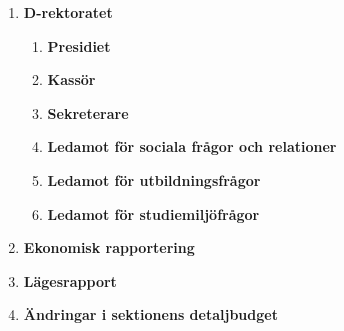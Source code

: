 \documentclass{protokoll}
\begin{document}
  \begin{enumerate}
    \item \textbf{D-rektoratet}
      \begin{enumerate}
        \item \textbf{Presidiet}
        \item \textbf{Kassör}
        \item \textbf{Sekreterare}
        \item \textbf{Ledamot för sociala frågor och relationer}
        \item \textbf{Ledamot för utbildningsfrågor}
        \item \textbf{Ledamot för studiemiljöfrågor}
      \end{enumerate}
    \item \textbf{Ekonomisk rapportering}
        \item \textbf{Lägesrapport}
        \item \textbf{Ändringar i sektionens detaljbudget}
  \end{enumerate}








\end{document}
